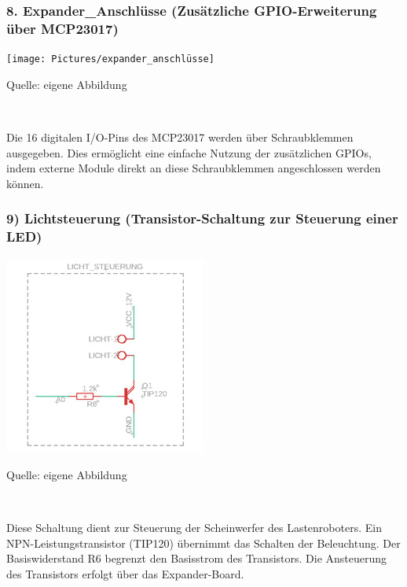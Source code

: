 \documentclass[ngerman,12pt,a4paper]{article}
\begin{document}
		\subsubsection{8. Expander\_Anschlüsse (Zusätzliche GPIO-Erweiterung über MCP23017)}
		
		\begin{center} 
			\begin{minipage}[t]{0.6\textwidth}
				\texttt{[image: Pictures/expander\_anschlüsse]}
				\label{fig: expander-anschlüsse}
				\vspace{-10pt}
				\begin{center}
					\par\small Quelle: eigene Abbildung
				\end{center}
			\end{minipage} \\[0.75cm]
		\end{center}
		Die 16 digitalen I/O-Pins des MCP23017 werden über Schraubklemmen ausgegeben. Dies ermöglicht eine einfache Nutzung der zusätzlichen GPIOs, indem externe Module direkt an diese Schraubklemmen angeschlossen werden können.
		\newpage
		\subsubsection*{9) Lichtsteuerung (Transistor-Schaltung zur Steuerung einer LED)}
		
		\begin{center} 
			\begin{minipage}[t]{0.4\textwidth}				\includegraphics[scale=0.7]{Pictures/Lichtsteuerung}
				\label{fig: Lichtsteuerung}
				\vspace{-10pt}
				\begin{center}
					\par\small Quelle: eigene Abbildung
				\end{center}
			\end{minipage} \\[0.75cm]
		\end{center}
		Diese Schaltung dient zur Steuerung der Scheinwerfer des Lastenroboters. Ein NPN-Leistungstransistor (TIP120) übernimmt das Schalten der Beleuchtung. Der Basiswiderstand R6 begrenzt den Basisstrom des Transistors. Die Ansteuerung des Transistors erfolgt über das Expander-Board.
		
\end{document}
